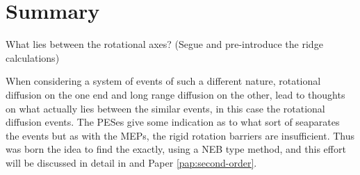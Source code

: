 \section{Summary}
\label{sec:borohydrides-summary}

\bit
\item What lies between the rotational axes? (Segue and pre-introduce the ridge calculations)
\eit

\incomplete

When considering a system of events of such a different nature, rotational diffusion on the one end and long range diffusion on the other, lead to thoughts on what actually lies between the similar events, in this case the rotational diffusion events.
The PESes give some indication as to what sort of  seaparates the events but as with the MEPs, the rigid rotation barriers are insufficient.
Thus was born the idea to find the  exactly, using a NEB type method, and this effort will be discussed in detail in  and Paper \ref{pap:second-order}.

